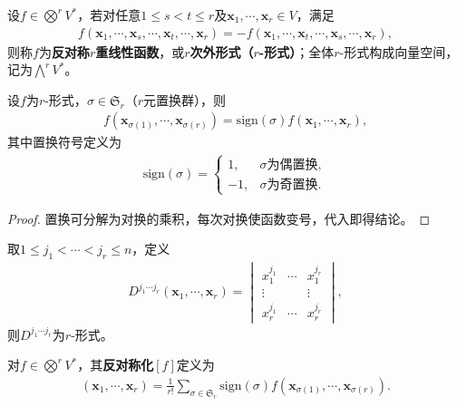 \documentclass[../../main.tex]{subfiles}%
\begin{document}
\begin{definition}
设$f\in\bigotimes^r V^*$，若对任意$1\leq s<t\leq r$及$\boldsymbol{x}_1,\cdots,\boldsymbol{x}_r\in V$，满足
\begin{align*}
f(\boldsymbol{x}_1,\cdots,\boldsymbol{x}_s,\cdots,\boldsymbol{x}_t,\cdots,\boldsymbol{x}_r)=-f(\boldsymbol{x}_1,\cdots,\boldsymbol{x}_t,\cdots,\boldsymbol{x}_s,\cdots,\boldsymbol{x}_r),
\end{align*}
则称$f$为\textbf{反对称$r$重线性函数}，或\textbf{$r$次外形式（$r$-形式）}；全体$r$-形式构成向量空间，记为$\bigwedge^r V^*$。
\end{definition}

\begin{proposition}
设$f$为$r$-形式，$\sigma\in\mathfrak{S}_r$（$r$元置换群），则
\begin{align}
f(\boldsymbol{x}_{\sigma(1)},\cdots,\boldsymbol{x}_{\sigma(r)})=\mathrm{sign}(\sigma)f(\boldsymbol{x}_1,\cdots,\boldsymbol{x}_r),
\label{eq:alternate_permutation}
\end{align}
其中置换符号定义为
\begin{align}
\mathrm{sign}(\sigma)=
\begin{cases}
1, & \sigma\text{为偶置换},\\
-1, & \sigma\text{为奇置换}.
\end{cases}
\label{eq:perm_sign}
\end{align}
\end{proposition}
\begin{proof}

置换可分解为对换的乘积，每次对换使函数变号，代入即得结论。

\end{proof}

\begin{definition}
取$1\leq j_1<\cdots<j_r\leq n$，定义
\begin{align}
D^{j_1\cdots j_r}(\boldsymbol{x}_1,\cdots,\boldsymbol{x}_r)=
\begin{vmatrix}
x_1^{j_1} & \cdots & x_1^{j_r}\\
\vdots & & \vdots\\
x_r^{j_1} & \cdots & x_r^{j_r}
\end{vmatrix},
\label{eq:det_form}
\end{align}
则$D^{j_1\cdots j_r}$为$r$-形式。
\end{definition}

\begin{definition}
对$f\in\bigotimes^r V^*$，其\textbf{反对称化}$[f]$定义为
\begin{align}
[f](\boldsymbol{x}_1,\cdots,\boldsymbol{x}_r)=\frac{1}{r!}\sum\limits_{\sigma\in\mathfrak{S}_r}\mathrm{sign}(\sigma)f(\boldsymbol{x}_{\sigma(1)},\cdots,\boldsymbol{x}_{\sigma(r)}).
\label{eq:antisymmetrization}
\end{align}
\end{definition}
\end{document}
